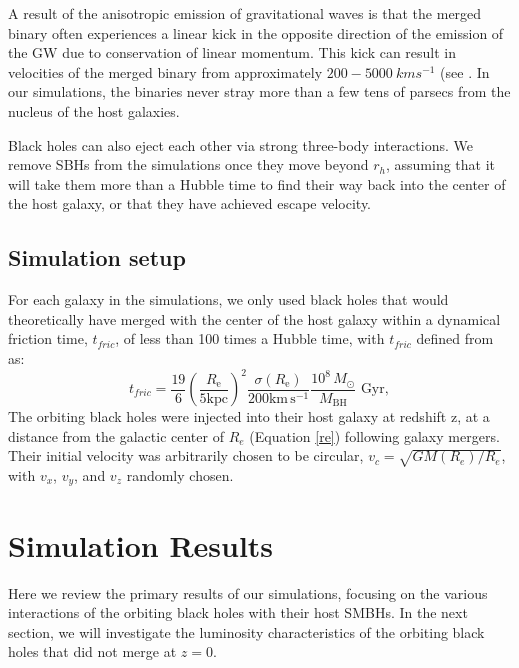\documentclass[fleqn,usenatbib,useAMS]{mnras}
\begin{document}
A result of the anisotropic emission of gravitational waves is that the merged binary often experiences a linear kick in the opposite direction of the emission of the GW due to conservation of linear momentum. This kick can result in velocities of the merged binary from approximately $200-5000\ km s^{-1}$ (see \citealt{2007PhRvL..98w1101G, 2007PhRvL..98i1101G, 2007PhRvL..98w1102C, 2011PhRvL.107w1102L}.  In our simulations, the binaries never stray more than a few tens of parsecs from the nucleus of the host galaxies.

Black holes can also eject each other via strong three-body interactions. We remove SBHs from the simulations once they move beyond $r_h$, assuming that it will take them more than a Hubble time to find their way back into the center of the host galaxy, or that they have achieved escape velocity.

\subsection{Simulation setup}\label{subsec:simset}
For each galaxy in the simulations, we only used black holes that would theoretically have merged with the center of the host galaxy within a dynamical friction time, $t_{fric}$, of less than 100 times a Hubble time, with $t_{fric}$ defined from \citet{2008gady.book.....B} as:
\begin{equation}\label{tfric}
    t_{fric} = \frac{19}{6}\left(\frac{R_\mathrm{e}}{5\mathrm{kpc}}\right)^2\frac{\sigma(R_\mathrm{e})}{200\mathrm{km}\,\mathrm{s}^{-1}}\frac{10^8\,M_{\odot}}{M_\mathrm{BH}} \text{  Gyr},
\end{equation}
The orbiting black holes were injected into their host galaxy at redshift z, at a distance from the galactic center of $R_{e}$ (Equation \ref{re}) following galaxy mergers.  Their initial velocity was arbitrarily chosen to be circular, $v_c = \sqrt{GM(R_e)/R_e}$, with $v_x$, $v_y$, and $v_z$ randomly chosen.

\section{Simulation Results}\label{sec:results}\label{sec:results_overview}
Here we review the primary results of our simulations, focusing on the various interactions of the orbiting black holes with their host SMBHs. In the next section, we will investigate the luminosity characteristics of the orbiting black holes that did not merge at $z=0$.
\end{document}

